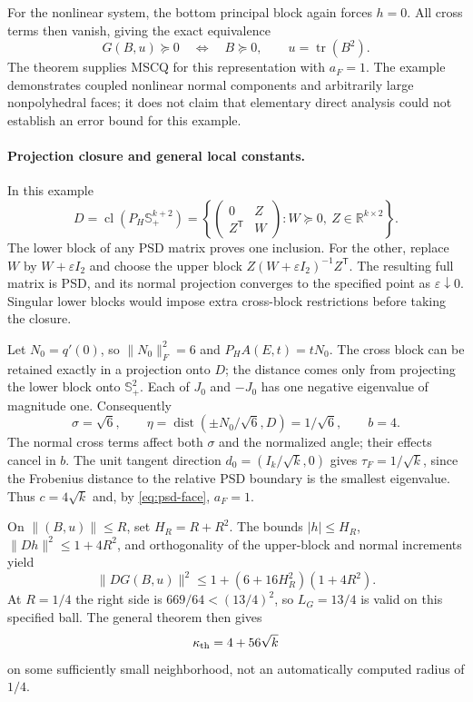 \documentclass[11pt]{article}
\numberwithin{equation}{section}
\theoremstyle{definition}
\theoremstyle{remark}
\DeclareMathOperator{\dist}{dist}
\DeclareMathOperator{\tr}{tr}
\DeclareMathOperator{\cl}{cl}
\newcommand{\R}{\mathbb R}
\newcommand{\Ssym}{\mathbb S}
\newcommand{\norm}[1]{\lVert #1\rVert}
\newcommand{\dset}[2]{\dist(#1,#2)}
\begin{document}
For the nonlinear system, the bottom principal block again forces $h=0$.
All cross terms then vanish, giving the exact equivalence
\begin{equation}
 G(B,u)\succeq0
 \quad\Longleftrightarrow\quad
 B\succeq0,\qquad u=\tr(B^2).
 \label{eq:psd-feasible}
\end{equation}
The theorem supplies MSCQ for this representation with $a_F=1$.
The example demonstrates coupled nonlinear normal components and
arbitrarily large nonpolyhedral faces; it does not claim that elementary
direct analysis could not establish an error bound for this example.

\paragraph{Projection closure and general local constants.}
In this example
\begin{equation}
 D=\cl(P_H\Ssym_+^{k+2})
 =\left\{\begin{pmatrix}0&Z\\Z^{\mathsf T}&W\end{pmatrix}:
             W\succeq0,\ Z\in\R^{k\times2}\right\}.
 \label{eq:psd-closure}
\end{equation}
The lower block of any PSD matrix proves one inclusion. For the other,
replace $W$ by $W+\varepsilon I_2$ and choose the upper block
$Z(W+\varepsilon I_2)^{-1}Z^{\mathsf T}$. The resulting full matrix
is PSD, and its normal projection converges to the specified point as
$\varepsilon\downarrow0$. Singular lower blocks would impose extra
cross-block restrictions before taking the closure.

Let $N_0=q'(0)$, so $\norm{N_0}_F^2=6$ and $P_HA(E,t)=tN_0$.
The cross block can be retained exactly in a projection onto $D$;
the distance comes only from projecting the lower block onto
$\Ssym_+^2$. Each of $J_0$ and $-J_0$ has one negative eigenvalue
of magnitude one. Consequently
\[
 \sigma=\sqrt6,\qquad
 \eta=\dset{\pm N_0/\sqrt6}{D}=1/\sqrt6,\qquad b=4.
\]
The normal cross terms affect both $\sigma$ and the normalized angle;
their effects cancel in $b$. The unit tangent direction
$d_0=(I_k/\sqrt k,0)$ gives $\tau_F=1/\sqrt k$, since the Frobenius
distance to the relative PSD boundary is the smallest eigenvalue.
Thus $c=4\sqrt k$ and, by \eqref{eq:psd-face}, $a_F=1$.

On $\norm{(B,u)}\leq R$, set $H_R=R+R^2$.
The bounds $|h|\leq H_R$, $\norm{Dh}^2\leq1+4R^2$, and orthogonality
of the upper-block and normal increments yield
\[
 \norm{DG(B,u)}^2\leq1+(6+16H_R^2)(1+4R^2).
\]
At $R=1/4$ the right side is $669/64<(13/4)^2$, so $L_G=13/4$ is
valid on this specified ball. The general theorem then gives
\begin{equation}
 \kappa_{\rm th}=4+56\sqrt k
 \label{eq:psd-kappa-th}
\end{equation}
on some sufficiently small neighborhood, not an automatically
computed radius of $1/4$.
\end{document}
